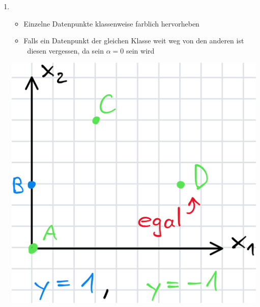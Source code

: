 
\begin{enumerate}
    \item {} \\
    \begin{minipage}[c]{0.6\columnwidth}
        \begin{itemize}
            \item Einzelne Datenpunkte klassenweise farblich hervorheben
            \item Falls ein Datenpunkt der gleichen Klasse weit weg von den anderen ist\\
            \textrightarrow\ diesen vergessen, da sein $\alpha = 0$ sein wird
        \end{itemize}
    \end{minipage}\hfill
    \begin{minipage}[c]{0.33\columnwidth}
        \includegraphics[width=\columnwidth]{images/SVM_2.png}
    \end{minipage}
    

\end{enumerate}
